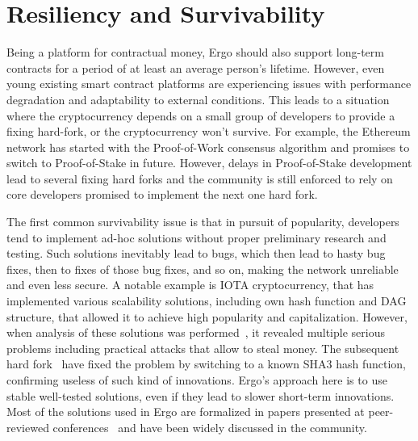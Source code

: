 \section{Resiliency and Survivability}
\label{sec:survivability}

Being a platform for contractual money, Ergo should also support long-term contracts for a period of at least an average person's lifetime.
However, even young existing smart contract platforms are experiencing issues with performance degradation and adaptability to external conditions.
This leads to a situation where the cryptocurrency depends on a small group of developers to provide a fixing hard-fork, or the cryptocurrency won't survive.
For example, the Ethereum network has started with the Proof-of-Work consensus algorithm and promises to switch to Proof-of-Stake in future.
However, delays in Proof-of-Stake development lead to several fixing hard forks\cite{ethDifficultyBomb} and the community is
still enforced to rely on core developers promised to implement the next one hard fork.


The first common survivability issue is that in pursuit of popularity, developers tend to implement ad-hoc solutions without proper preliminary research and testing.
Such solutions inevitably lead to bugs, which then lead to hasty bug fixes, then to fixes of those bug fixes, and so on, making the network unreliable and even less secure.
A notable example is IOTA cryptocurrency, that has implemented various scalability solutions, including own hash function and DAG structure,  that allowed it to achieve high popularity and capitalization.
However, when analysis of these solutions was performed~\cite{heilmancryptanalysis, de2018break}, it revealed multiple serious problems including practical attacks that allow to steal money.
The subsequent hard fork~\cite{IOTAReport} have fixed the problem by switching to a known SHA3 hash function, confirming useless of such kind of innovations.
Ergo's approach here is to use stable well-tested solutions, even if they lead to slower short-term innovations.
Most of the solutions used in Ergo are formalized in papers presented at peer-reviewed
conferences~\cite{reyzin2017improving,meshkov2017short,chepurnoy2018systematic,chepurnoy2018self,chepurnoy2018checking,duong2018multi}
and have been widely discussed in the community.


